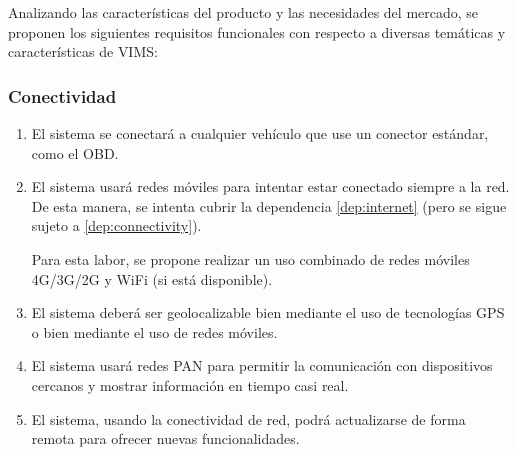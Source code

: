 Analizando las características del producto y las necesidades del mercado, se
proponen los siguientes requisitos funcionales con respecto a diversas temáticas
y características de \ac{VIMS}:

\subsubsection{Conectividad}
\begin{enumerate}[label=\textbf{\texttt{RF-\arabic*}}]
  \item\label{req:connectivity} El sistema se conectará a cualquier vehículo que use
        un conector estándar, como el \ac{OBD}.
  \item\label{req:network} El sistema usará redes móviles para intentar
        estar conectado siempre a la red. De esta manera, se intenta cubrir la dependencia
        \ref{dep:internet} (pero se sigue sujeto a \ref{dep:connectivity}).

        Para esta labor, se propone realizar un uso combinado de redes móviles 4G/3G/2G
        y WiFi (si está disponible).
  \item\label{req:gps} El sistema deberá ser geolocalizable bien mediante el uso
        de tecnologías GPS o bien mediante el uso de redes móviles.
  \item\label{req:bt} El sistema usará redes \ac{PAN} para
        permitir la comunicación con dispositivos cercanos y mostrar información en
        tiempo casi real.
  \item\label{req:ota} El sistema, usando la conectividad de red, podrá actualizarse
        de forma remota para ofrecer nuevas funcionalidades.
\end{enumerate}

